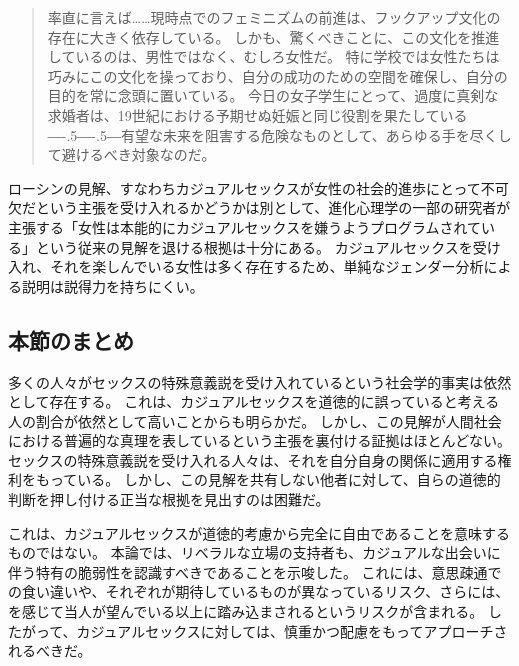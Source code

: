 \documentclass[paper=a4,book,openany]{jlreq}
\def\DDASH{―\kern-.5\zw―\kern-.5\zw―} %
\begin{document}
\begin{quote}
  率直に言えば……現時点でのフェミニズムの前進は、フックアップ文化の存在に大きく依存している。
しかも、驚くべきことに、この文化を推進しているのは、男性ではなく、むしろ女性だ。
特に学校では女性たちは巧みにこの文化を操っており、自分の成功のための空間を確保し、自分の目的を常に念頭に置いている。
今日の女子学生にとって、過度に真剣な求婚者は、19世紀における予期せぬ妊娠と同じ役割を果たしている{\DDASH}有望な未来を阻害する危険なものとして、あらゆる手を尽くして避けるべき対象なのだ。
\citep{rosin12:_boys_side}
\end{quote}

ローシンの見解、すなわちカジュアルセックスが女性の社会的進歩にとって不可欠だという主張を受け入れるかどうかは別として、進化心理学の一部の研究者が主張する「女性は本能的にカジュアルセックスを嫌うようプログラムされている」という従来の見解を退ける根拠は十分にある。
カジュアルセックスを受け入れ、それを楽しんでいる女性は多く存在するため、単純なジェンダー分析による説明は説得力を持ちにくい。

\subsection{本節のまとめ}

多くの人々がセックスの特殊意義説を受け入れているという社会学的事実は依然として存在する。
これは、カジュアルセックスを道徳的に誤っていると考える人の割合が依然として高いことからも明らかだ。
しかし、この見解が人間社会における普遍的な真理を表しているという主張を裏付ける証拠はほとんどない。
セックスの特殊意義説を受け入れる人々は、それを自分自身の関係に適用する権利をもっている。
しかし、この見解を共有しない他者に対して、自らの道徳的判断を押し付ける正当な根拠を見出すのは困難だ。

これは、カジュアルセックスが道徳的考慮から完全に自由であることを意味するものではない。
本論では、リベラルな立場の支持者も、カジュアルな出会いに伴う特有の脆弱性を認識すべきであることを示唆した。
これには、意思疎通での食い違いや、それぞれが期待しているものが異なっているリスク、さらには、を感じて当人が望んでいる以上に踏み込まされるというリスクが含まれる。
したがって、カジュアルセックスに対しては、慎重かつ配慮をもってアプローチされるべきだ。
\end{document}
